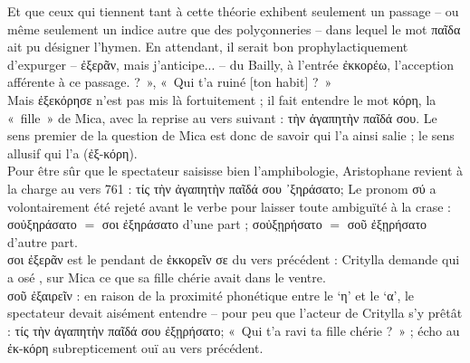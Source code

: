 {{Et que ceux qui tiennent tant à cette théorie exhibent seulement un passage -- ou même seulement un indice autre que des polyçonneries -- dans lequel le mot παῖδα ait pu désigner l'hymen. En attendant, il serait bon prophylactiquement d'expurger -- ἐξερᾶν, mais j'anticipe... -- du Bailly, à l'entrée ἐκκορέω, l'acception  afférente à ce passage.} ?~», «~Qui t'a ruiné [ton habit] ?~»\\
Mais ἐξεκόρησε n'est pas mis là fortuitement ; il fait entendre le mot κόρη, la «~fille~» de Mica, avec la reprise au vers suivant : τὴν ἀγαπητὴν παῖδά σου.
Le sens premier de la question de Mica est donc de savoir qui l'a ainsi salie ; le sens allusif qui l'a  (ἐξ-κόρη).\\
Pour être sûr que le spectateur saisisse bien l'amphibologie, Aristophane revient à la charge au vers 761 : τίς τὴν ἀγαπητὴν παῖδά σου ᾿ξηράσατο;
Le pronom σύ a volontairement été rejeté avant le verbe pour laisser toute ambiguïté à la crase : σοὐξηράσατο $=$ σοι ἐξηράσατο d'une part ; σοὐξῃρήσατο $=$ σοῦ ἐξῃρήσατο d'autre part.\\
σοι ἐξερᾶν est le pendant de ἐκκορεῖν σε du vers précédent : Critylla demande qui a osé ,  sur Mica ce que sa fille chérie avait dans le ventre.\\
σοῦ ἐξαιρεῖν : en raison de la proximité phonétique entre le `η' et le `α', le spectateur devait aisément entendre -- pour peu que l'acteur de Critylla s'y prêtât : τίς τὴν ἀγαπητὴν παῖδά σου ἐξῃρήσατο; «~Qui t'a ravi ta fille chérie ?~» ; écho au ἐκ-κόρη subrepticement ouï au vers précédent.}
